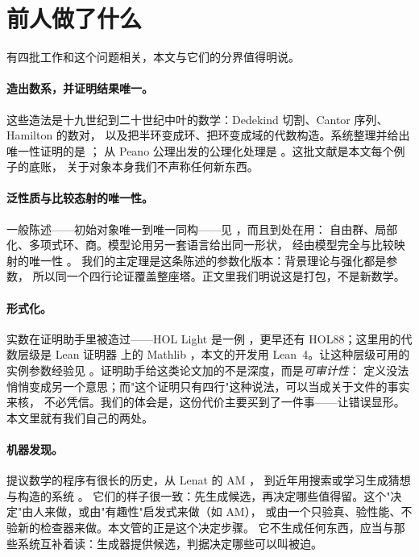 \documentclass[aps,prd,preprint,superscriptaddress,amsmath,amssymb]{revtex4-2}
\begin{document}
\section{前人做了什么}
\label{sec:related}

有四批工作和这个问题相关，本文与它们的分界值得明说。

\paragraph{造出数系，并证明结果唯一。}
这些造法是十九世纪到二十世纪中叶的数学：Dedekind 切割、Cantor 序列、Hamilton 的数对，
以及把半环变成环、把环变成域的代数构造。系统整理并给出唯一性证明的是 \cite{ebb}；
从 Peano 公理出发的公理化处理是 \cite{landau}。这批文献是本文每个例子的底账，
关于对象本身我们不声称任何新东西。

\paragraph{泛性质与比较态射的唯一性。}
一般陈述——初始对象唯一到唯一同构——见 \cite{MacLane1971}，而且到处在用：
自由群、局部化、多项式环、商。模型论用另一套语言给出同一形状，
经由模型完全与比较映射的唯一性 \cite{EklofSabbagh1971,Hodges1993}。
我们的主定理是这条陈述的参数化版本：背景理论与强化都是参数，
所以同一个四行论证覆盖整座塔。正文里我们明说这是打包，不是新数学。

\paragraph{形式化。}
实数在证明助手里被造过——HOL Light 是一例 \cite{Harrison1998}，更早还有 HOL88；这里用的代数层级是 Lean 证明器 \cite{lean} 上的 Mathlib \cite{mathlib}，本文的开发用 Lean~4。让这种层级可用的实例参数经验见
\cite{Baanen2022}。证明助手给这类论文加的不是深度，而是\emph{可审计性}：
定义没法悄悄变成另一个意思；而"这个证明只有四行"这种说法，可以当成关于文件的事实来核，
不必凭信。我们的体会是，这份代价主要买到了一件事——让错误显形。
本文里就有我们自己的两处。

\paragraph{机器发现。}
提议数学的程序有很长的历史，从 Lenat 的 \textsc{AM} \cite{lenat1976}，
到近年用搜索或学习生成猜想与构造的系统 \cite{davies2021,raayoni2021,romera2024}。
它们的样子很一致：先生成候选，再决定哪些值得留。这个"决定"由人来做，或由"有趣性"启发式来做（如 \textsc{AM}），
或由一个只验真、验性能、不验新的检查器来做。本文管的正是这个决定步骤。
它不生成任何东西，应当与那些系统互补着读：生成器提供候选，判据决定哪些可以叫被迫。
\end{document}
